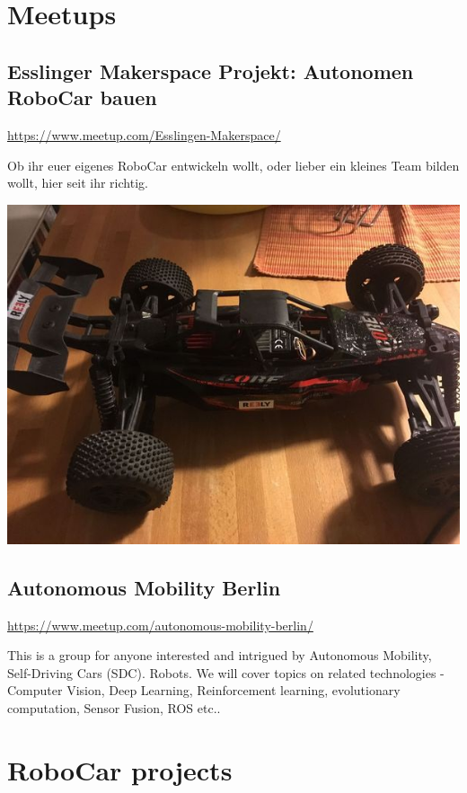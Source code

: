 \documentclass[]{book}
\begin{document}
\section{Meetups}\label{meetups}

\subsection{Esslinger Makerspace Projekt: Autonomen RoboCar
bauen}\label{esslinger-makerspace-projekt-autonomen-robocar-bauen}

\url{https://www.meetup.com/Esslingen-Makerspace/}

Ob ihr euer eigenes RoboCar entwickeln wollt, oder lieber ein kleines
Team bilden wollt, hier seit ihr richtig.

\includegraphics[width=8.33in]{images/EliasCar}

\subsection{Autonomous Mobility
Berlin}\label{autonomous-mobility-berlin}

\url{https://www.meetup.com/autonomous-mobility-berlin/}

This is a group for anyone interested and intrigued by Autonomous
Mobility, Self-Driving Cars (SDC). Robots. We will cover topics on
related technologies - Computer Vision, Deep Learning, Reinforcement
learning, evolutionary computation, Sensor Fusion, ROS etc..

\section{RoboCar projects}\label{robocar-projects}
\end{document}

